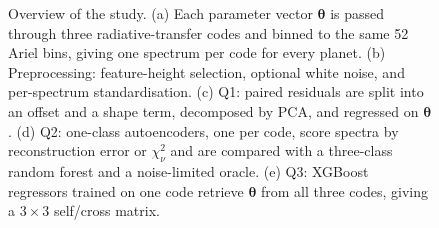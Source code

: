 \begin{figure}[t]
  \centering
  \caption{Overview of the study.
  (a) Each parameter vector $\bm{\theta}$ is passed through three radiative-transfer codes and binned to the same 52 Ariel bins, giving one spectrum per code for every planet.
  (b) Preprocessing: feature-height selection, optional white noise, and per-spectrum standardisation.
  (c) Q1: paired residuals are split into an offset and a shape term, decomposed by PCA, and regressed on $\bm{\theta}$.
  (d) Q2: one-class autoencoders, one per code, score spectra by reconstruction error or $\chi^{2}_{\nu}$ and are compared with a three-class random forest and a noise-limited oracle.
  (e) Q3: XGBoost regressors trained on one code retrieve $\bm{\theta}$ from all three codes, giving a $3\times3$ self/cross matrix.}
  \label{fig:pipeline}
\end{figure}
